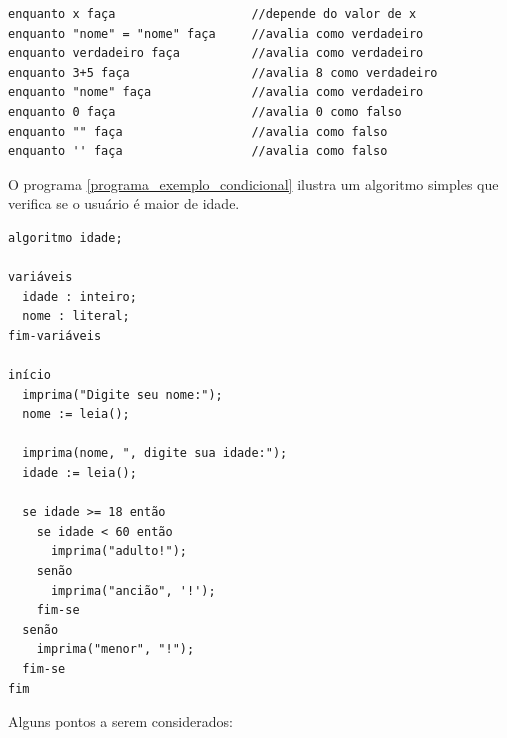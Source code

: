 \documentclass[a4paper,11pt]{report}
\begin{document}
\begin{verbatim}
enquanto x faça                   //depende do valor de x
enquanto "nome" = "nome" faça     //avalia como verdadeiro
enquanto verdadeiro faça          //avalia como verdadeiro
enquanto 3+5 faça                 //avalia 8 como verdadeiro
enquanto "nome" faça              //avalia como verdadeiro
enquanto 0 faça                   //avalia 0 como falso
enquanto "" faça                  //avalia como falso
enquanto '' faça                  //avalia como falso
\end{verbatim}

O programa \ref{programa_exemplo_condicional}
ilustra um algoritmo simples que verifica se
o usuário é maior de idade.
\bigskip

\begin{program}
 \begin{verbatim}
algoritmo idade;

variáveis
  idade : inteiro;
  nome : literal;
fim-variáveis

início
  imprima("Digite seu nome:");
  nome := leia();

  imprima(nome, ", digite sua idade:");
  idade := leia();

  se idade >= 18 então
    se idade < 60 então
      imprima("adulto!");
    senão
      imprima("ancião", '!');
    fim-se
  senão
    imprima("menor", "!");
  fim-se
fim
  \end{verbatim}
  \caption{Exemplo de programa que utiliza estrutura condicional.
\label{programa_exemplo_condicional}}
\end{program}

Alguns pontos a serem considerados:
\end{document}
